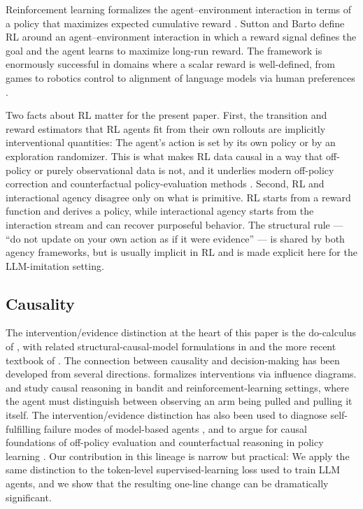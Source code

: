 \documentclass[11pt]{article}
\begin{document}
Reinforcement learning formalizes the agent--environment interaction in terms of a policy that maximizes expected cumulative reward \citep{suttonBarto2018,bertsekas1996neuro}. Sutton and Barto define RL around an agent--environment interaction in which a reward signal defines the goal and the agent learns to maximize long-run reward. The framework is enormously successful in domains where a scalar reward is well-defined, from games \citep{mnih2015dqn,silver2017alphazero} to robotics control \citep{levine2016end} to alignment of language models via human preferences \citep{christiano2017deep,ouyang2022instructgpt}.

Two facts about RL matter for the present paper. First, the transition and reward estimators that RL agents fit from their own rollouts are implicitly interventional quantities: The agent's action is set by its own policy or by an exploration randomizer. This is what makes RL data causal in a way that off-policy or purely observational data is not, and it underlies modern off-policy correction and counterfactual policy-evaluation methods \citep{precup2000eligibility,thomas2016data,bareinboim2015bandits}. Second, RL and interactional agency disagree only on what is primitive. RL starts from a reward function and derives a policy, while interactional agency starts from the interaction stream and can recover purposeful behavior. The structural rule --- ``do not update on your own action as if it were evidence'' --- is shared by both agency frameworks, but is usually implicit in RL and is made explicit here for the LLM-imitation setting.

\subsection{Causality}
\label{sec:rw-causality}

The intervention/evidence distinction at the heart of this paper is the do-calculus of \citet{pearl1995do,pearl2009causality}, with related structural-causal-model formulations in \citet{spirtes2000causation} and the more recent textbook of \citet{peters2017elements}. 
The connection between causality and decision-making has been developed from several directions. \citet{dawid2002influence} formalizes interventions via influence diagrams. \citet{bareinboim2015bandits} and \citet{zhang2020causal} study causal reasoning in bandit and reinforcement-learning settings, where the agent must distinguish between observing an arm being pulled and pulling it itself. The intervention/evidence distinction has also been used to diagnose self-fulfilling failure modes of model-based agents \citep{ortega2021shaking}, and to argue for causal foundations of off-policy evaluation and counterfactual reasoning in policy learning \citep{buesing2019woulda}. Our contribution in this lineage is narrow but practical: We apply the same distinction to the token-level supervised-learning loss used to train LLM agents, and we show that the resulting one-line change can be dramatically significant.
\end{document}
